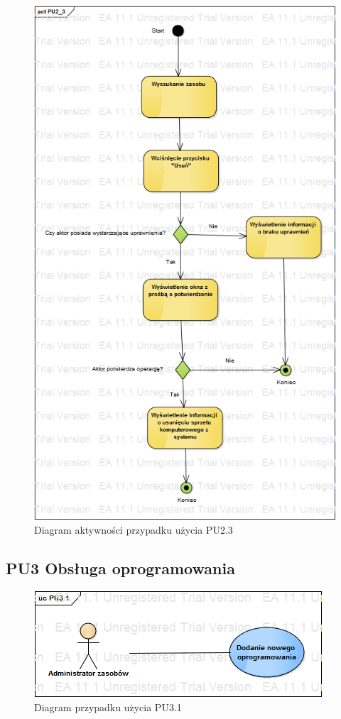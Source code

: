 \begin{figure}[h!]
	\centering
	\includegraphics[scale=0.5]{img/diagrams/activityDiagrams/PU2_3}
	\caption{Diagram aktywności przypadku użycia PU2.3 \label{fig:labelADPU2.3}}
\end{figure}

\subsection{PU3 Obsługa oprogramowania} \label{pu3}

\begin{figure}[h!]
	\centering
	\includegraphics[scale=0.6]{img/diagrams/useCaseDiagrams/PU3_1.png}
	\caption{Diagram przypadku użycia PU3.1 \label{fig:labelUCPU3.1}}
\end{figure}

